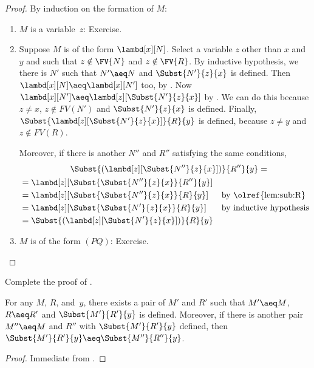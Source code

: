 \documentclass[../../../include/open-logic-section]{subfiles}
\begin{document}
\begin{proof}
  By induction on the formation of $M$:
  \begin{enumerate}
  \item $M$ is a variable~$z$: Exercise.
  \item Suppose $M$ is of the form $\lambd[x][N]$.  Select a variable
    $z$ other than $x$ and $y$ and such that $z \notin \FV{N}$ and $z
    \notin \FV{R}$.  By inductive hypothesis, we there is $N'$ such
    that $N' \aeq N$ and $\Subst{N'}{z}{x}$ is defined. Then
    $\lambd[x][N] \aeq \lambd[x][N']$ too, by
    .  Now $\lambd[x][N']
    \aeq \lambd[z][\Subst{N'}{z}{x}]$ by
    .  We can do this
    because $z \ne x$, $z \notin FV(N')$ and $\Subst{N'}{z}{x}$ is
    defined. Finally, $\Subst{\lambd[z][\Subst{N'}{z}{x}]}{R}{y}$ is
    defined, because $z \neq y$ and $z \notin FV(R)$.

    Moreover, if there is another $N''$ and $R''$ satisfying the same
    conditions,
    \begin{multline*}
      \Subst{(\lambd[z][\Subst{N''}{z}{x}])}{R''}{y} =\\
    \begin{aligned}
      &= \lambd[z][\Subst{\Subst{N''}{z}{x}}{R''}{y}] \\
      &= \lambd[z][\Subst{\Subst{N''}{z}{x}}{R}{y}] && \text{by
        \olref{lem:sub:R}}\\
      &=\lambd[z][\Subst{\Subst{N'}{z}{x}}{R}{y}]
      && \text{by inductive
        hypothesis}\\
      &=\Subst{(\lambd[z][\Subst{N'}{z}{x}])}{R}{y}
    \end{aligned}
    \end{multline*}
    \item $M$ is of the form $(PQ)$: Exercise.
  \end{enumerate}
\end{proof}

\begin{prob}
  Complete the proof of .
\end{prob}

\begin{cor}
  For any $M$, $R$, and~$y$, there exists a pair of $M'$ and $R'$
  such that $M' \aeq M$, $R \aeq R'$ and $\Subst{M'}{R'}{y}$ is
  defined. Moreover, if there is another pair $M'' \aeq M$ and $R''$
  with $\Subst{M'}{R'}{y}$ defined, then $\Subst{M'}{R'}{y} \aeq
  \Subst{M''}{R''}{y}$.
\end{cor}

\begin{proof}
  Immediate from .
\end{proof}
\end{document}
